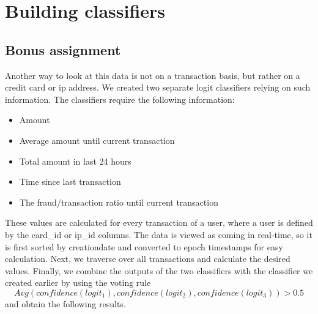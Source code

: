 \section*{Building classifiers}



\subsection*{Bonus assignment}
Another way to look at this data is not on a transaction basis, but rather on a credit card or ip address. We created two separate logit classifiers relying on such information. The classifiers require the following information:

\begin{itemize}
	\item Amount
	\item Average amount until current transaction
	\item Total amount in last 24 hours
	\item Time since last transaction
	\item The fraud/transaction ratio until current transaction
\end{itemize}

These values are calculated for every transaction of a user, where a user is defined by the card\_id or ip\_id columns. The data is viewed as coming in real-time, so it is first sorted by creationdate and converted to epoch timestamps for easy calculation. Next, we traverse over all transactions and calculate the desired values. Finally, we combine the outputs of the two classifiers with the classifier we created earlier by using the voting rule $$Avg(confidence(logit_1), confidence(logit_2), confidence(logit_3))>0.5$$ and obtain the following results.

